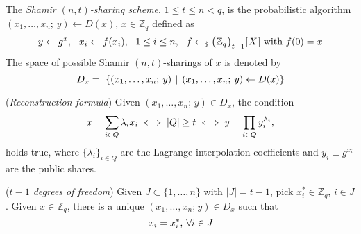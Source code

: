 \documentclass{iacrtrans}
\begin{document}
\begin{defn}\label{shamir_definition}
The \textit{Shamir $(n, t)$-sharing scheme}, $1 \le t \le n < q$,
is the probabilistic algorithm
$(x_1, \dots, x_n;\hspace{2pt} y) \leftarrow D(x),
\hspace{2pt} x \in \mathbb{Z}_q$
defined as
\vspace{5pt}
\begin{equation*}
y \leftarrow g ^ x,
\ \ x_i \leftarrow f(x_i),
\ \ 1 \le i \le n,
\ \ f \leftarrow_\$ \big(
	\hspace{0.3pt}
	\mathbb{Z}_q
	\hspace{0.3pt}
	\big)_{t-1}
	\hspace{0.3pt}
	[
		\hspace{0.5pt}
		X
		\hspace{0.5pt}
	]
\textup{ with }
f(0) = x
\hspace{0pt}
\vspace{5pt}
\end{equation*}
The space of possible Shamir $(n,t)$-sharings of $x$
is denoted by
\vspace{5pt}
\begin{equation*}
D_x =\
\left\{(x_1, \dots, x_n;\hspace{2pt} y)
\hspace{4pt}
\middle\vert
\hspace{4pt}
(x_1, \dots, x_n;\hspace{2pt} y) \leftarrow D(x)
\right\}
\hspace{0pt}
\vspace{5pt}
\end{equation*}
\end{defn}

\begin{rem}\label{shamir_reconstruction}
(\textit{Reconstruction formula})
Given $(x_1, \dots, x_n;\hspace{2pt} y) \in D_x$,
the condition
\vspace{5pt}
\begin{equation}\label{shamir_threshold_condition}
x = \sum_{i \in Q} \lambda_i x_i
\iff
|Q| \ge t
\iff
y = \prod_{i \in Q} y_i^{\lambda_i},
\vspace{5pt}
\end{equation}
holds true,
where $\{\lambda_i\}_{i \in Q}$ are the
Lagrange interpolation coefficients
and $y_i\equiv g ^ {x_i}$
are the public shares.
\end{rem}

\begin{rem}\label{shamir_degrees_of_freedom}
(\textit{$t - 1$ degrees of freedom})
Given $J \subset \{1, \dots, n\}$ with $|J| = t - 1$,
pick $x^*_i \in \mathbb{Z}_q,\hspace{2pt} i \in J$.
Given $x \in \mathbb{Z}_q$, there is a unique
$(x_1, \dots, x_n;\hspace{1pt} y) \in D_x$
such that
\vspace{5pt}
\begin{equation*}
x_i = x^*_i,\hspace{2pt}\forall i \in J
\vspace{5pt}
\end{equation*}
\end{rem}
\end{document}
